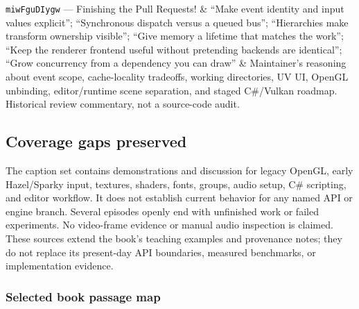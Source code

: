 {\begin{longtable}[]
\texttt{miwFguDIygw} --- Finishing the Pull Requests! & ``Make event identity and input values explicit''; ``Synchronous dispatch versus a queued bus''; ``Hierarchies make transform ownership visible''; ``Give memory a lifetime that matches the work''; ``Keep the renderer frontend useful without pretending backends are identical''; ``Grow concurrency from a dependency you can draw'' & Maintainer's reasoning about event scope, cache-locality tradeoffs, working directories, UV UI, OpenGL unbinding, editor/runtime scene separation, and staged C\#/Vulkan roadmap. Historical review commentary, not a source-code audit. \\
\end{longtable}
}

\subsection{Coverage gaps preserved}\label{appendix-877738f6f4d2-coverage-gaps-preserved}

The caption set contains demonstrations and discussion for legacy OpenGL, early Hazel/Sparky input, textures, shaders, fonts, groups, audio setup, C\# scripting, and editor workflow. It does not establish current behavior for any named API or engine branch. Several episodes openly end with unfinished work or failed experiments. No video-frame evidence or manual audio inspection is claimed. These sources extend the book's teaching examples and provenance notes; they do not replace its present-day API boundaries, measured benchmarks, or implementation evidence.

\subsubsection{Selected book passage map}\label{appendix-877738f6f4d2-selected-book-passage-map}

